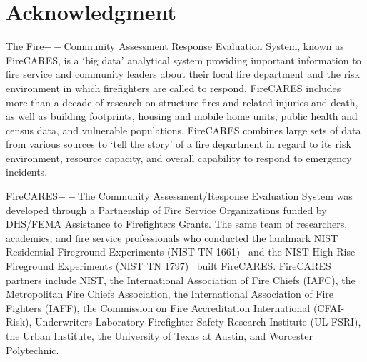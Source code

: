 \documentclass[12pt,oneside]{book}
\begin{document}



\newpage

\cleardoublepage



\renewcommand*\contentsname{\color{fc_blue}Contents}
\tableofcontents

\hypersetup{ 
    linkcolor=fc_orange,         %
    filecolor=fc_orange,      %
    urlcolor=fc_orange,           %
}    

\newpage
\mainmatter

\chapter{Acknowledgment}

The Fire$--$Community Assessment Response Evaluation System, known as FireCARES, is a `big data' analytical system providing important information to fire service and community leaders about their local fire department and the risk environment in which firefighters are called to respond. FireCARES includes more than a decade of research on structure fires and related injuries and death, as well as building footprints, housing and mobile home units, public health and census data, and vulnerable populations. FireCARES combines large sets of data from various sources to `tell the story' of a fire department in regard to its risk environment, resource capacity, and overall capability to respond to emergency
incidents.

FireCARES$--$The Community Assessment/Response Evaluation System was developed through a Partnership of Fire Service Organizations funded by DHS/FEMA Assistance to Firefighters Grants. The same team of researchers, academics, and fire service professionals who conducted the landmark NIST Residential Fireground Experiments (NIST TN 1661)~\cite{NIST:Residential} and the NIST High-Rise Fireground Experiments (NIST TN 1797)~\cite{NIST:HighRise} built FireCARES. FireCARES partners include NIST, the International Association of Fire Chiefs (IAFC), the Metropolitan Fire Chiefs Association, the International Association of Fire Fighters (IAFF), the Commission on Fire Accreditation International (CFAI-Risk), Underwriters Laboratory Firefighter Safety Research Institute (UL FSRI), the Urban Institute, the University of Texas at Austin, and Worcester Polytechnic.
\end{document}
